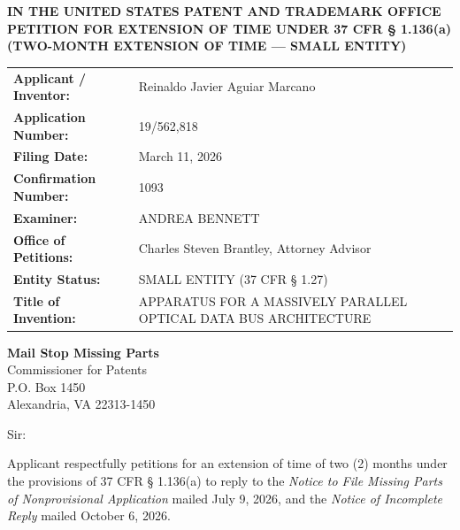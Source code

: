 \documentclass[11pt,letterpaper]{article}
\begin{document}
\thispagestyle{empty}

\begin{center}
    \textbf{\large IN THE UNITED STATES PATENT AND TRADEMARK OFFICE} \\
    \vspace{0.3cm}
    \textbf{\large PETITION FOR EXTENSION OF TIME UNDER 37 CFR \S{} 1.136(a)} \\
    \textbf{\normalsize (TWO-MONTH EXTENSION OF TIME --- SMALL ENTITY)}
\end{center}

\vspace{0.4cm}
\noindent\begin{tabular}{p{2.3in}p{4.0in}}
\textbf{Applicant / Inventor:} & Reinaldo Javier Aguiar Marcano \\
\textbf{Application Number:} & 19/562,818 \\
\textbf{Filing Date:} & March 11, 2026 \\
\textbf{Confirmation Number:} & 1093 \\
\textbf{Examiner:} & ANDREA BENNETT \\
\textbf{Office of Petitions:} & Charles Steven Brantley, Attorney Advisor \\
\textbf{Entity Status:} & SMALL ENTITY (37 CFR \S{} 1.27) \\
\textbf{Title of Invention:} & APPARATUS FOR A MASSIVELY PARALLEL OPTICAL DATA BUS ARCHITECTURE \\
\end{tabular}

\vspace{0.5cm}
\noindent\textbf{Mail Stop Missing Parts} \\
Commissioner for Patents \\
P.O. Box 1450 \\
Alexandria, VA 22313-1450

\vspace{0.2cm}
Sir:

Applicant respectfully petitions for an extension of time of two (2) months under the provisions of 37 CFR \S{} 1.136(a) to reply to the \textit{Notice to File Missing Parts of Nonprovisional Application} mailed July 9, 2026, and the \textit{Notice of Incomplete Reply} mailed October 6, 2026.
\end{document}
